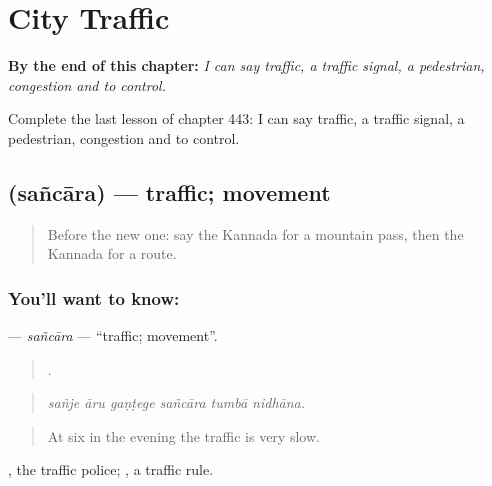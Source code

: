 
\chapter{City Traffic}
\label{ch:ka-city-traffic}

\begin{chapteropening}
\textbf{By the end of this chapter:} \emph{I can say traffic, a traffic signal, a pedestrian, congestion and to control.}

Complete the last lesson of chapter 443: I can say traffic, a traffic signal, a pedestrian, congestion and to control.
\end{chapteropening}

\section[\texorpdfstring{\kn{ಸಂಚಾರ} (sañcāra)}{ಸಂಚಾರ (sañcāra)}]{ (sañcāra) — traffic; movement}

\label{lesson:KA-C443-sancara}



\begin{quote}
Before the new one: say the Kannada for a mountain pass, then the Kannada for a route.
\end{quote}

\subsection*{You'll want to know: }
\textbf{} — \emph{sañcāra} — \textquotedblleft{}traffic; movement\textquotedblright{}.

\begin{quote}
     .
\end{quote}

\begin{quote}
\emph{sañje āru gaṇṭege sañcāra tumbā nidhāna.}
\end{quote}

\begin{quote}
At six in the evening the traffic is very slow.
\end{quote}

 , the traffic police;  , a traffic rule.

